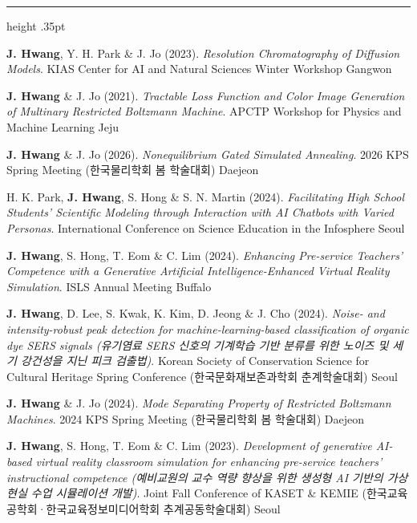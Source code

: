 \documentclass[overlapped,line]{res}
\renewcommand{\sectionfont}{\normalsize\bfseries\scshape\color{cvnavy}}
\renewcommand{\section}[1]{%
  \par\Needspace{4\baselineskip}\addvspace{.105in}%
  \noindent{\sectionfont #1}\par\vspace{.025in}%
  {\color{cvrule}\hrule height .35pt}\vspace{.045in}%
  \nopagebreak[3]}
\newenvironment{cvitemscompact}{
  \begin{list}{}{%
      \setlength{\itemsep}{.035in}
      \setlength{\parsep}{0in}
      \setlength{\parskip}{0in}
      \setlength{\topsep}{.018in}
      \setlength{\partopsep}{0in}
      \setlength{\leftmargin}{.12in}
      \setlength{\rightmargin}{0in}}}{\end{list}}
\begin{document}
\begin{resume}
\section{\sc Conference Presentations}
\begin{cvitemscompact}
\item \textbf{J. Hwang}, Y. H. Park \& J. Jo (2023). \textit{Resolution Chromatography of Diffusion Models}. KIAS Center for AI and Natural Sciences Winter Workshop \hfill Gangwon
\item \textbf{J. Hwang} \& J. Jo (2021). \textit{Tractable Loss Function and Color Image Generation of Multinary Restricted Boltzmann Machine}. APCTP Workshop for Physics and Machine Learning \hfill Jeju

\item \textbf{J. Hwang} \& J. Jo (2026). \textit{Nonequilibrium Gated Simulated Annealing}. 2026 KPS Spring Meeting (한국물리학회 봄 학술대회) \hfill Daejeon
\item H. K. Park, \textbf{J. Hwang}, S. Hong \& S. N. Martin (2024). \textit{Facilitating High School Students' Scientific Modeling through Interaction with AI Chatbots with Varied Personas}. International Conference on Science Education in the Infosphere \hfill Seoul
\item \textbf{J. Hwang}, S. Hong, T. Eom \& C. Lim (2024). \textit{Enhancing Pre-service Teachers' Competence with a Generative Artificial Intelligence-Enhanced Virtual Reality Simulation}. ISLS Annual Meeting \hfill Buffalo
\item \textbf{J. Hwang}, D. Lee, S. Kwak, K. Kim, D. Jeong \& J. Cho (2024). \textit{Noise- and intensity-robust peak detection for machine-learning-based classification of organic dye SERS signals (유기염료 SERS 신호의 기계학습 기반 분류를 위한 노이즈 및 세기 강건성을 지닌 피크 검출법)}. Korean Society of Conservation Science for Cultural Heritage Spring Conference (한국문화재보존과학회 춘계학술대회) \hfill Seoul
\item \textbf{J. Hwang} \& J. Jo (2024). \textit{Mode Separating Property of Restricted Boltzmann Machines}. 2024 KPS Spring Meeting (한국물리학회 봄 학술대회) \hfill Daejeon
\item \textbf{J. Hwang}, S. Hong, T. Eom \& C. Lim (2023). \textit{Development of generative AI-based virtual reality classroom simulation for enhancing pre-service teachers' instructional competence (예비교원의 교수 역량 향상을 위한 생성형 AI 기반의 가상현실 수업 시뮬레이션 개발)}. Joint Fall Conference of KASET \& KEMIE (한국교육공학회·한국교육정보미디어학회 추계공동학술대회) \hfill Seoul

\end{cvitemscompact}
\end{resume}
\end{document}
